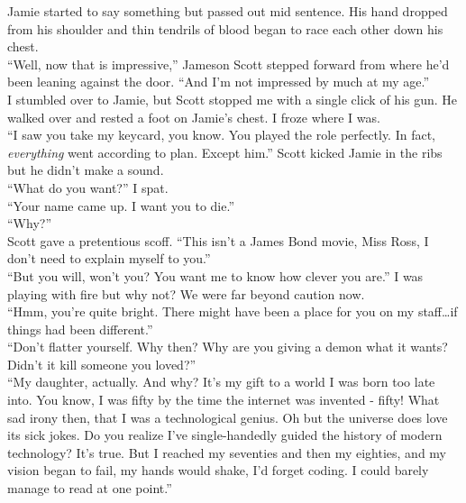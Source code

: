 \documentclass[a5paper]{scrartcl}
\begin{document}
Jamie started to say something but passed out mid sentence. His hand dropped from his shoulder and thin tendrils of blood began to race each other down his chest.\\


\enquote{Well, now that is impressive,} Jameson Scott stepped forward from where he'd been leaning against the door. \enquote{And I'm not impressed by much at my age.}\\


I stumbled over to Jamie, but Scott stopped me with a single click of his gun. He walked over and rested a foot on Jamie's chest. I froze where I was. \\


\enquote{I saw you take my keycard, you know. You played the role perfectly. In fact, \textit{everything}
 went according to plan. Except him.} Scott kicked Jamie in the ribs but he didn't make a sound.\\


\enquote{What do you want?} I spat.\\


\enquote{Your name came up. I want you to die.}\\


\enquote{Why?}\\


Scott gave a pretentious scoff. \enquote{This isn't a James Bond movie, Miss Ross, I don't need to explain myself to you.}\\


\enquote{But you will, won't you? You want me to know how clever you are.} I was playing with fire but why not? We were far beyond caution now. \\


\enquote{Hmm, you're quite bright. There might have been a place for you on my staff\dots if things had been different.}\\


\enquote{Don't flatter yourself. Why then? Why are you giving a demon what it wants? Didn't it kill someone you loved?}\\


\enquote{My daughter, actually. And why? It's my gift to a world I was born too late into. You know, I was fifty by the time the internet was invented - fifty! What sad irony then, that I was a technological genius. Oh but the universe does love its sick jokes. Do you realize I've single-handedly guided the history of modern technology? It's true. But I reached my seventies and then my eighties, and my vision began to fail, my hands would shake, I'd forget coding. I could barely manage to read at one point.}\\
\end{document}
